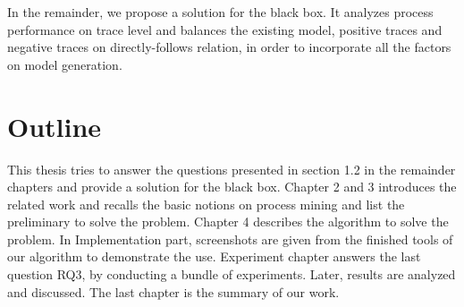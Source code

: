 In the remainder, we propose a solution for the black box. It analyzes process performance on trace level and balances the existing model, positive traces and negative traces on directly-follows relation, in order to incorporate all the factors on model generation. 

\section{Outline}
This thesis tries to answer the questions presented in section 1.2 in the remainder chapters and provide a solution for the black box. 
Chapter 2 and 3 introduces the related work and recalls the basic notions on process mining and list the preliminary to solve the problem. 
Chapter 4 describes the algorithm to solve the problem. 
In Implementation part, screenshots are given from the finished tools of our algorithm to demonstrate the use.  Experiment chapter answers the last question RQ3, by conducting a bundle of experiments. Later, results are analyzed and discussed. 
The last chapter is the summary of our work. 



%